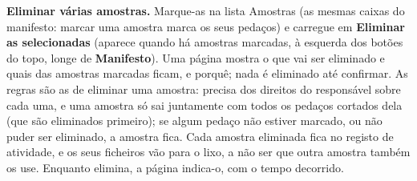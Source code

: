 \documentclass[11pt,a4paper]{article}
\newcommand{\ui}[1]{\textsf{\textbf{#1}}}
\newcommand{\menu}[1]{\textsf{#1}}
\begin{document}
\textbf{Eliminar várias amostras.} Marque-as na lista \menu{Amostras} (as
mesmas caixas do manifesto: marcar uma amostra marca os seus pedaços) e
carregue em \ui{Eliminar as selecionadas} (aparece quando há amostras marcadas, à
esquerda dos botões do topo, longe de \ui{Manifesto}). Uma página mostra o que vai ser
eliminado e quais das amostras marcadas ficam, e porquê; nada é eliminado
até confirmar. As regras são as de eliminar uma amostra: precisa dos direitos
do responsável sobre cada uma, e uma amostra só sai juntamente com todos os
pedaços cortados dela (que são eliminados primeiro); se algum pedaço não
estiver marcado, ou não puder ser eliminado, a amostra fica. Cada amostra
eliminada fica no registo de atividade, e os seus ficheiros vão para o lixo,
a não ser que outra amostra também os use. Enquanto elimina, a página indica-o,
com o tempo decorrido.
\end{document}
